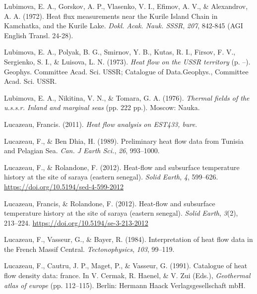 \documentclass[draft,linenumbers]{agujournal2018}
\begin{document}
\leavevmode{}%
Lubimova, E. A., Gorskov, A. P., Vlasenko, V. I., Efimov, A. V., \&
Alexandrov, A. A. (1972). Heat flux measurements near the {Kurile Island
Chain} in {Kamchatka}, and the {Kurile Lake}. \emph{Dokl. Acak. Nauk.
SSSR}, \emph{207}, 842-845 (AGI English Transl. 24-28).

\leavevmode{}%
Lubimova, E. A., Polyak, B. G., Smirnov, Y. B., Kutas, R. I., Firsov, F.
V., Sergienko, S. I., \& Luisova, L. N. (1973). \emph{Heat flow on the
USSR territory} (p. --). Geophys. Committee Acad. Sci. USSR; Catalogue
of Data.Geophys., Committee Acad. Sci. USSR.

\leavevmode{}%
Lubimova, E. A., Nikitina, V. N., \& Tomara, G. A. (1976). \emph{Thermal
fields of the u.s.s.r. Inland and marginal seas} (pp. 222 pp.). Moscow:
Nauka.

\leavevmode{}%
Lucazeau, Francis. (2011). \emph{Heat flow analysis on EST433, bure}.

\leavevmode{}%
Lucazeau, F., \& Ben Dhia, H. (1989). Preliminary heat flow data from
{Tunisia and Pelagian Sea}. \emph{Can. J Earth Sci.}, \emph{26},
993--1000.

\leavevmode{}%
Lucazeau, F., \& Rolandone, F. (2012). Heat-flow and subsurface
temperature history at the site of saraya (eastern senegal). \emph{Solid
Earth}, \emph{4}, 599--626. \url{https://doi.org/10.5194/sed-4-599-2012}

\leavevmode{}%
Lucazeau, Francis, \& Rolandone, F. (2012). Heat-flow and subsurface
temperature history at the site of saraya (eastern senegal). \emph{Solid
Earth}, \emph{3}(2), 213--224.
\url{https://doi.org/10.5194/se-3-213-2012}

\leavevmode{}%
Lucazeau, F., Vasseur, G., \& Bayer, R. (1984). Interpretation of heat
flow data in the {French Massif Central}. \emph{Tectonophysics},
\emph{103}, 99--119.

\leavevmode{}%
Lucazeau, F., Cautru, J. P., Maget, P., \& Vasseur, G. (1991). Catalogue
of heat flow density data: france. In V. Cermak, R. Haenel, \& V. Zui
(Eds.), \emph{Geothermal atlas of europe} (pp. 112--115). Berlin:
Hermann Haack Verlagsgesellschaft mbH.
\end{document}
